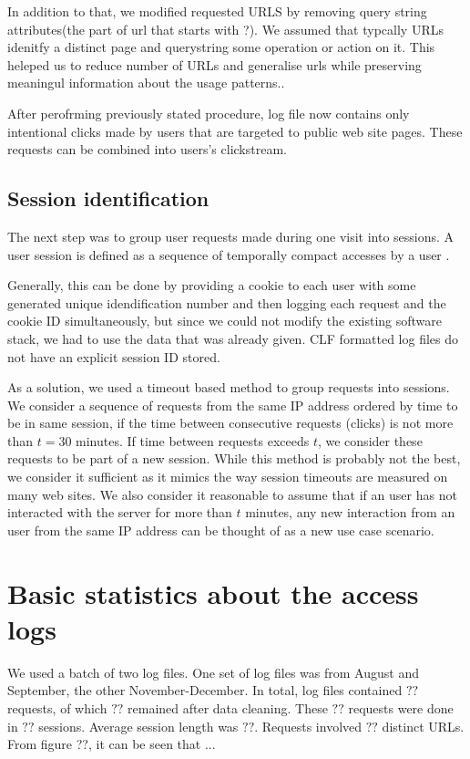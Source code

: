 \documentclass[english,a4paper]{article}
\begin{document}
In addition to that, we modified requested URLS by  removing query string attributes(the part of url that starts with ?).  We assumed that typcally URLs idenitfy a distinct page and querystring some operation or action on it. This heleped us to reduce number of URLs and generalise urls while preserving meaningul information about the usage patterns..

After perofrming previously stated procedure, log file now contains only intentional clicks made by users that are targeted to public web site pages. These requests can be combined into users's clickstream.

\subsection{Session identification}
The next step was to group user requests made during one visit into sessions. A user session is defined as a sequence of temporally compact accesses by a user \cite{on_mining_logs}.

Generally, this can be done by providing a cookie to each user with some generated unique idendification number and then logging each request and the cookie ID simultaneously, but since we could not modify the existing software stack, we had to use the data that was already given. CLF formatted log files do not have an explicit session ID stored. 

As a solution, we used a timeout based method to group requests into sessions. We consider a sequence of requests from the same IP address ordered by time to be in
same session, if the time between consecutive requests (clicks) is not more
than $t = 30$ minutes. If time between requests exceeds $t$, we
consider these requests to be part of a new session. While this method is
probably not the best, we consider it sufficient as it mimics the way session
timeouts are measured on many web sites. We also consider it reasonable to
assume that if an user has not interacted with the server for more than $t$
minutes, any new interaction from an user from the same IP address can be
thought of as a new use case scenario.

\section{Basic statistics about the access logs} 
We used a batch of two log files. One set of log files was from August and September, the other November-December. In total, log files contained 
$??$ requests, of which $??$ remained after data cleaning. These $??$ requests were done in $??$ sessions. Average session length was $??$. Requests involved $??$ distinct URLs. From figure ??, it can be seen that ...
\end{document}
